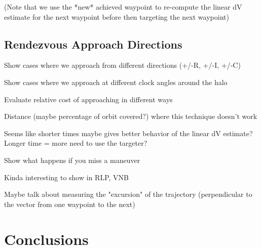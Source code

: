 \documentclass[a4paper]{article}
\begin{document}
(Note that we use the *new* achieved waypoint to re-compute the linear dV estimate for the next waypoint before then targeting the next waypoint)

\subsection{Rendezvous Approach Directions}

Show cases where we approach from different directions (+/-R, +/-I, +/-C)

Show cases where we approach at different clock angles around the halo

Evaluate relative cost of approaching in different ways

Distance (maybe percentage of orbit covered?) where this technique doesn't work

Seems like shorter times maybe gives better behavior of the linear dV estimate?  Longer time = more need to use the targeter?

Show what happens if you miss a maneuver

Kinda interesting to show in RLP, VNB

Maybe talk about measuring the "excursion" of the trajectory (perpendicular to the vector from one waypoint to the next)

\section{Conclusions}

\begin{thebibliography}{99}
\end{thebibliography}
\end{document}
